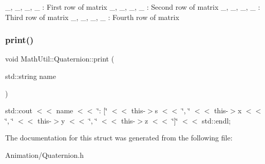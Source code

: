 \+\_, \+\_, \+\_, \+\_ \+: First row of matrix \+\_, \+\_, \+\_, \+\_ \+: Second row of matrix \+\_, \+\_, \+\_, \+\_ \+: Third row of matrix \+\_, \+\_, \+\_, \+\_ \+: Fourth row of matrix \mbox{\label{structMathUtil_1_1Quaternion_abd27342d40655826b293ccfc382601d5}} 
\subsubsection{\texorpdfstring{print()}{print()}}
{\footnotesize\ttfamily void Math\+Util\+::\+Quaternion\+::print (\begin{DoxyParamCaption}\item[{std\+::string}]{name }\end{DoxyParamCaption})\hspace{0.3cm}{\ttfamily [inline]}}

std\+::cout $<$$<$ name $<$$<$ \char`\"{}\+: \mbox{[}\char`\"{} $<$$<$ this-\/$>$s $<$$<$ \char`\"{}, \char`\"{} $<$$<$ this-\/$>$x $<$$<$ \char`\"{}, \char`\"{} $<$$<$ this-\/$>$y $<$$<$ \char`\"{}, \char`\"{} $<$$<$ this-\/$>$z $<$$<$ \char`\"{}\mbox{]}\char`\"{} $<$$<$ std\+::endl; 

The documentation for this struct was generated from the following file\+:\begin{DoxyCompactItemize}
\item 
Animation/Quaternion.\+h\end{DoxyCompactItemize}
